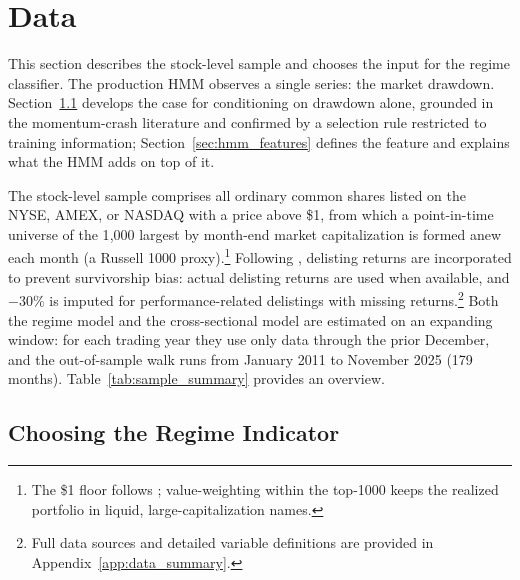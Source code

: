 
\clearpage
\section{Data}\label{sec:data}

This section describes the stock-level sample and chooses the input for the regime classifier. The production HMM observes a single series: the market drawdown. Section~\ref{sec:feature_selection} develops the case for conditioning on drawdown alone, grounded in the momentum-crash literature and confirmed by a selection rule restricted to training information; Section~\ref{sec:hmm_features} defines the feature and explains what the HMM adds on top of it.

The stock-level sample comprises all ordinary common shares listed on the NYSE, AMEX, or NASDAQ with a price above \$1, from which a point-in-time universe of the 1{,}000 largest by month-end market capitalization is formed anew each month (a Russell 1000 proxy).\footnote{The \$1 floor follows \citet{Gu2020}; value-weighting within the top-1000 keeps the realized portfolio in liquid, large-capitalization names.} Following \citet{Shumway1997}, delisting returns are incorporated to prevent survivorship bias: actual delisting returns are used when available, and $-30\%$ is imputed for performance-related delistings with missing returns.\footnote{Full data sources and detailed variable definitions are provided in Appendix~\ref{app:data_summary}.} Both the regime model and the cross-sectional model are estimated on an expanding window: for each trading year they use only data through the prior December, and the out-of-sample walk runs from January 2011 to November 2025 (179 months). Table~\ref{tab:sample_summary} provides an overview.




\subsection{Choosing the Regime Indicator}\label{sec:feature_selection}

